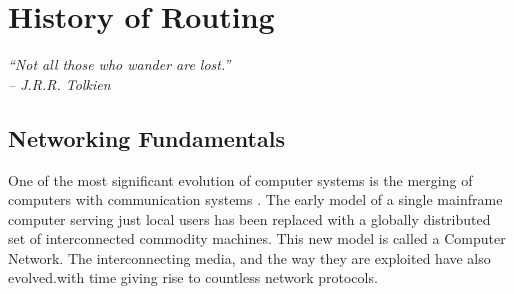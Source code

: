 \chapter{History of Routing}
\label{chap:hist}
\begin{flushright}
 \textit{\textquotedblleft Not all those who wander are lost.\textquotedblright}\\
\textit{-- J.R.R. Tolkien}
\end{flushright}
\ifpdf
      
\graphicspath{{2-HistoryOfRouting/Chapter1Figs/PNG/}{2-HistoryOfRouting/Chapter1Figs/PDF/}{2-HistoryOfRouting/Chapter1Figs/}}
\else
   
\graphicspath{{2-HistoryOfRouting/Chapter1Figs/EPS/}{2-HistoryOfRouting/Chapter1Figs/}}
\fi

\section{Networking Fundamentals}



One of the most significant evolution of computer systems is the merging of computers with communication systems \cite{Tanenbaum}. The early model of a single mainframe computer serving just local users has been replaced with a globally distributed set of interconnected commodity machines. This new model is called a Computer Network. The interconnecting media, and the way they are exploited have also evolved.with time giving rise to countless network protocols.


